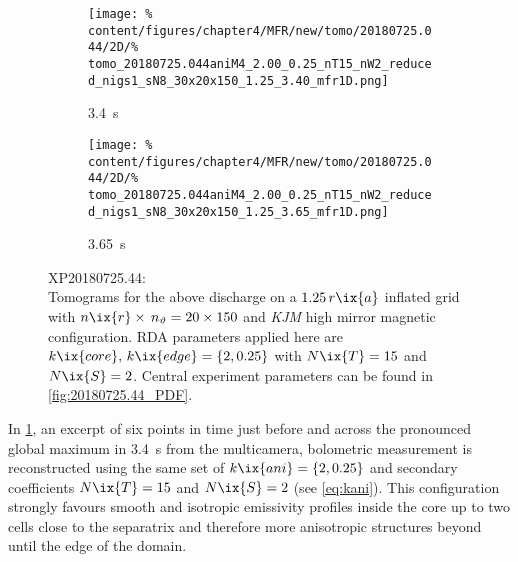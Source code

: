\begin{figure}[t]
                \newline%
                \begin{subfigure}{0.475\textwidth}%
                    \centering%
                    \caption{\SI{3.4}{\second}}%
                    \vspace*{-0.1cm}%
                    \texttt{[image: \%
                        content/figures/chapter4/MFR/new/tomo/20180725.044/2D/\%
                        tomo\_20180725.044aniM4\_2.00\_0.25\_nT15\_nW2\_reduced\_nigs1\_sN8\_30x20x150\_1.25\_3.40\_mfr1D.png]}%
                \end{subfigure}%
                \hfill%
                \begin{subfigure}{0.475\textwidth}%
                    \centering%
                    \caption{\SI{3.65}{\second}}%
                    \vspace*{-0.1cm}%
                    \texttt{[image: \%
                        content/figures/chapter4/MFR/new/tomo/20180725.044/2D/\%
                        tomo\_20180725.044aniM4\_2.00\_0.25\_nT15\_nW2\_reduced\_nigs1\_sN8\_30x20x150\_1.25\_3.65\_mfr1D.png]}%
                \end{subfigure}%
                \caption{%
                    XP20180725.44:\\%
                    Tomograms for the above discharge on a $1.25\,r\ix{a}$ inflated grid with $n\ix{r}\times\,n_{\vartheta}=20\times150$ and \textit{KJM} high mirror magnetic configuration. RDA parameters applied here are $k\ix{core},\,k\ix{edge}=\left\{2, 0.25\right\}$ with $N\ix{T}=15$ and $N\ix{S}=2$. Central experiment parameters can be found in \cref{fig:20180725.44_PDF}.}\label{fig:tomo_20180725.44_times}%
            \end{figure}%
%
            In \cref{fig:tomo_20180725.44_times}, an excerpt of six points in time just before and across the pronounced global maximum in \SI{3.4}{\second} from the multicamera, bolometric measurement is reconstructed using the same set of $k\ix{ani}=\left\{2, 0.25\right\}$ and secondary coefficients $N\ix{T}=15$ and $N\ix{S}=2$ (see \cref{eq:kani}). This configuration strongly favours smooth and isotropic emissivity profiles inside the core up to two cells close to the separatrix and therefore more anisotropic structures beyond until the edge of the domain.\\%
